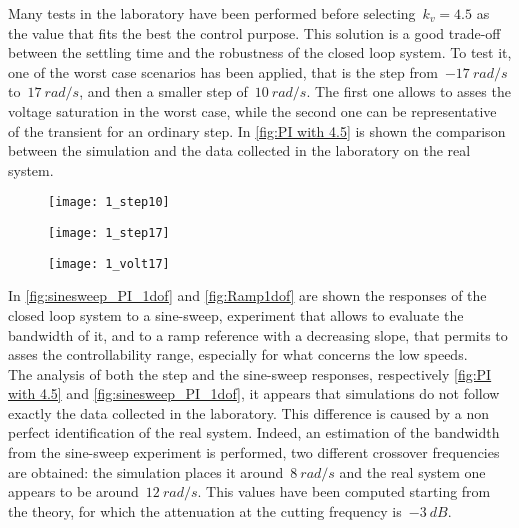 Many tests in the laboratory have been performed before selecting~$k_v=4.5$ as the value that fits the best the control purpose. This solution is a good trade-off between the settling time and the robustness of the closed loop system.
To test it, one of the worst case scenarios has been applied, that is the step from~$-17\ rad/s$ to~$17\ rad/s$, and then a smaller step of~$10\ rad/s$. The first one allows to asses the voltage saturation in the worst case, while the second one can be representative of the transient for an ordinary step.
In \cref{fig:PI with 4.5} is shown the comparison between the simulation and the data collected in the laboratory on the real system.
\begin{figure*}[h]
	\centering
	\begin{subfigure}{0.45\columnwidth}
		\texttt{[image: 1\_step10]}
	\end{subfigure}
	\begin{subfigure}{0.45\columnwidth}
		\texttt{[image: 1\_step17]}
	\end{subfigure}
	\newline
	\begin{subfigure}{0.45\columnwidth}
		\texttt{[image: 1\_volt17]}
	\end{subfigure}
	\caption{Speed control loop with $k_{v}=4.5$}
	\label{fig:PI with 4.5}
\end{figure*}

In \cref{fig:sinesweep_PI_1dof} and \cref{fig:Ramp1dof} are shown the responses of the closed loop system to a sine-sweep, experiment that allows to evaluate the bandwidth of it, and to a ramp reference with a decreasing slope, that permits to asses the controllability range, especially for what concerns the low speeds. \\
The analysis of both the step and the sine-sweep responses, respectively \cref{fig:PI with 4.5} and \cref{fig:sinesweep_PI_1dof}, it appears that simulations do not follow exactly the data collected in the laboratory. This difference is caused by a non perfect identification of the real system. Indeed, an estimation of the bandwidth from the sine-sweep experiment is performed, two different crossover frequencies are obtained: the simulation places it around~$8\ rad/s$ and the real system one appears to be around~$12\ rad/s$. This values have been computed starting from the theory, for which the attenuation at the cutting frequency is~$-3\ dB$. \\

